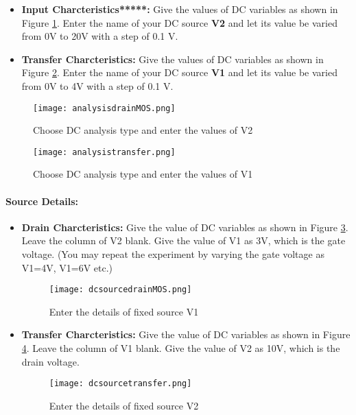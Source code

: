 \begin{itemize}
\item 
\textbf{Input Charcteristics*****:} Give the values of DC variables as shown in Figure \ref{analysisdrainMOS}. Enter the name of your DC source \textbf{V2} and let its value be varied from 0V to 20V with a step of 0.1 V.


\item
 \textbf{Transfer Charcteristics:} Give the values of DC variables as shown in Figure \ref{analysistransferMOS}. Enter the name of your DC source \textbf{V1} and let its value be varied from 0V to 4V with a step of 0.1 V.


\end{itemize}

\begin{figure}[h]
\centering
\texttt{[image: analysisdrainMOS.png]}
\caption{Choose DC analysis type and enter the values of V2}
\label{analysisdrainMOS}
\end{figure}

\begin{figure}[h]
\centering
\texttt{[image: analysistransfer.png]}
\caption{Choose DC analysis type and enter the values of V1}
\label{analysistransferMOS}
\end{figure}
\paragraph{Source Details:} 
\begin{itemize}
\item \textbf{Drain Charcteristics:} Give the value of DC variables as shown in Figure \ref{dcsourcedrainMOS}. Leave the column of V2 blank. Give the value of V1 as 3V, which is the gate voltage. (You may repeat the experiment by varying the gate voltage as V1=4V, V1=6V etc.)
\begin{figure}[h]
\centering
\texttt{[image: dcsourcedrainMOS.png]}
\caption{Enter the details of fixed source V1}
\label{dcsourcedrainMOS}
\end{figure}

\item \textbf{Transfer Charcteristics:} Give the value of DC variables as shown in Figure \ref{dcsourcetransferMOS}. Leave the column of V1 blank. Give the value of V2 as 10V, which is the drain voltage. 
\begin{figure}[h]
\centering
\texttt{[image: dcsourcetransfer.png]}
\caption{Enter the details of fixed source V2}
\label{dcsourcetransferMOS}
\end{figure}

\end{itemize}

